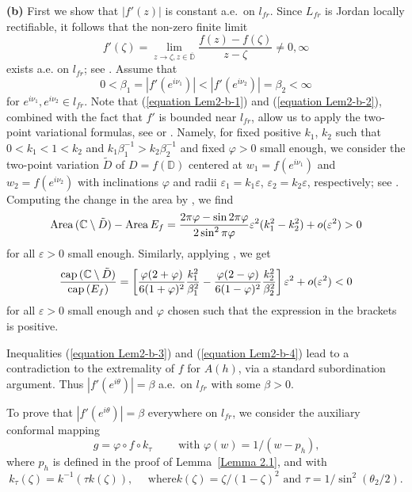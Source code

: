 \documentclass[mn,a4paper,fleqn]{w-art}
\newcommand{\CAP}{{\rm cap}\,}
\newcommand{\be}{\begin{equation}}
\newcommand{\ee}{\end{equation}}
\newcommand{\e}{\varepsilon}
\begin{document}
{\textbf{(b)} First we show that $|f'(z)|$ is constant a.e.\ on
$l_{fr}$. Since $L_{fr}$ is Jordan locally rectifiable, it follows
that the
non-zero finite limit %
\be   \label{equation Lem2-b-1}   %
f'(\zeta)=\lim_{z\to\zeta,z\in \overline{\mathbb{D}}}
\frac{f(z)-f(\zeta)}{z-\zeta}\not= 0,\infty %
\ee   %
exists  a.e. on $l_{fr}$; see \cite[Theorem 6.8, Exercise
6.4.5]{P}. Assume that %
\be   \label{equation Lem2-b-2}%
0<\beta_1=|f'(e^{i\nu_1})|<|f'(e^{i\nu_2})|=\beta_2<\infty  %
\ee     %
for $e^{i\nu_1}, e^{i\nu_2}\in l_{fr}$. Note that (\ref{equation
Lem2-b-1}) and (\ref{equation Lem2-b-2}), combined with the fact
that $f'$ is bounded near $l_{fr}$, allow us to apply the
two-point variational formulas, see \cite[Lemma~10]{BS} or
\cite[Lemma~5]{BPS1}. Namely, for fixed positive $k_1$, $k_2$ such
that $ 0<k_1<1<k_2$ and $k_1\beta_1^{-1}>k_2\beta_2^{-1}$ and
fixed $\varphi>0$ small enough, we consider the two-point
variation $\tilde D$ of $D=f(\mathbb{D})$ centered at
$w_1=f(e^{i\nu_1})$ and $w_2=f(e^{i\nu_2})$ with inclinations
$\varphi$ and radii $\e_1=k_1 \e$, $\e_2=k_2 \e$, respectively;
see \cite[Section~2]{BPS1}. Computing the change in the area by 
\cite[formula (2.11)]{BPS1}, we find %
\be \label{equation Lem2-b-3}%
{\rm{Area}}\,(\mathbb{C}\setminus\tilde D)-
{\rm{Area}}\,E_f=\frac{2\pi\varphi-\sin 2\pi\varphi}{2\sin^2
\pi\varphi}\e^2(k_1^2-k_2^2)+o(\e^2)>0 %
\ee   %
for all $\e>0$ small enough. Similarly, applying  \cite[formula
(2.10)]{BPS1}, we get  %
\be \label{equation Lem2-b-4}  %
\frac{\CAP(\mathbb{C}\setminus \tilde
D)}{\CAP(E_f)}=\left[\frac{\varphi(2+\varphi)}{6(1+
\varphi)^2}\frac{k_1^2}{\beta_1^2}-
\frac{\varphi(2-\varphi)}{6(1-\varphi)^2}\frac{k_2^2}{\beta_2^2}\right]
\e^2+o(\e^2)<0  %
\ee   %
for all $\e>0$ small enough and $\varphi$ chosen such that the
expression in the brackets is positive.

Inequalities (\ref{equation Lem2-b-3}) and (\ref{equation Lem2-b-4}) lead to
a contradiction to the extremality of $f$ for $A(h)$, via a
standard subordination argument.
  Thus $|f'(e^{i\theta})|=\beta$ a.e.\  on $l_{fr}$ with some $\beta>0$.

To prove that $|f'(e^{i\theta})|=\beta$ everywhere on $l_{fr}$, we consider the
auxiliary conformal mapping %
\be \label{equation 2.7}  %
g=\varphi\circ f\circ k_\tau \quad \quad {\mbox{ with
\ \ $\varphi(w)=1/(w-p_h)$,}}  %
\ee  %
 where $p_h$ is defined in the proof of
Lemma~\ref{Lemma 2.1}, and with %
$$  %
k_\tau(\zeta)=k^{-1}(\tau k(\zeta)), \quad {\mbox{ where
$k(\zeta)=\zeta/(1-\zeta)^2$ and $\tau=1/\sin^{2}(\theta_2/2)$.}}  %
$$  %

}
\end{document}

